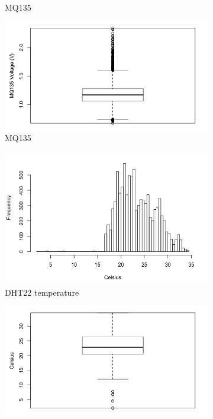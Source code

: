 \documentclass[11pt,twosided,a4paper]{report}
\begin{document}
\begin{figure}[!tbp]
\begin{minipage}{1\linewidth}
\begin{subfigure}[t]{.4\linewidth}
                \caption{MQ135}
                \label{fig:mq135_histogram}
            \end{subfigure}
            \hfill
            \begin{subfigure}[t]{.4\linewidth}
            	\includegraphics[width=\textwidth]{images/mq135_boxplot}
            	\caption{MQ135}
            	\label{fig:mq135_boxplot}
	   \end{subfigure}
        \end{minipage}
    \begin{minipage}{1\linewidth}
            \begin{subfigure}[t]{.4\linewidth}
                \includegraphics[width=\textwidth]{images/temp_histogram}
                \caption{DHT22 temperature}
                \label{fig:temp_histogram}
            \end{subfigure}
            \hfill
            \begin{subfigure}[t]{.4\linewidth}
            	\includegraphics[width=\textwidth]{images/temp_boxplot}

\end{subfigure}
\end{minipage}
\end{figure}
\end{document}
